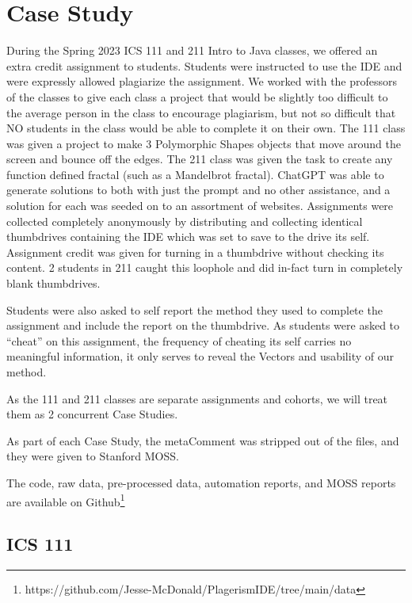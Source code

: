 \documentclass[letterpaper,10pt,conference]{IEEEtran}
\newcommand{\metaComment}{metaComment\xspace}
\begin{document}
\section{Case Study}

    \label{sec:casestudy}
During the Spring 2023 ICS 111 and 211 Intro to Java classes, we offered an extra credit assignment to students.
Students were instructed to use the IDE and were expressly allowed plagiarize the assignment.  We worked with the professors of the classes to give each class a project that would be slightly too difficult to the average person in the class to encourage plagiarism, but not so difficult that NO students in the class would be able to complete it on their own.  The 111 class was given a project to make 3 Polymorphic Shapes objects that move around the screen and bounce off the edges.  The 211 class was given the task to create any function defined fractal (such as a Mandelbrot fractal).  ChatGPT was able to generate solutions to both with just the prompt and no other assistance, and a solution for each was seeded on to an assortment of websites.  Assignments were collected completely anonymously by distributing and collecting identical thumbdrives containing the IDE which was set to save to the drive its self.  Assignment credit was given for turning in a thumbdrive without checking its content.  2 students in 211 caught this loophole and did in-fact turn in completely blank thumbdrives.

Students were also asked to self report the method they used to complete the assignment and include the report on the thumbdrive.  As students were asked to ``cheat'' on this assignment, the frequency of cheating its self carries no meaningful information, it only serves to reveal the Vectors and usability of our method.

As the 111 and 211 classes are separate assignments and cohorts, we will treat them as 2 concurrent Case Studies. 

As part of each Case Study, the \metaComment was stripped out of the files, and they were given to Stanford MOSS.

The code, raw data, pre-processed data, automation reports, and MOSS reports are available on Github\footnote{https://github.com/Jesse-McDonald/PlagerismIDE/tree/main/data}
\subsection{ICS 111}
    \label{sec:casestudy111}
\end{document}
